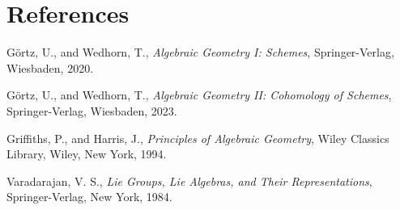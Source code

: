 \documentclass[12pt]{article}
\begin{document}
\section{References}
\begin{enumerate}
    Görtz, U., and Wedhorn, T.,
    \textit{Algebraic Geometry I: Schemes},
    Springer-Verlag, Wiesbaden, 2020.

    Görtz, U., and Wedhorn, T.,
    \textit{Algebraic Geometry II: Cohomology of Schemes},
    Springer-Verlag, Wiesbaden, 2023.

    Griffiths, P., and Harris, J.,
    \textit{Principles of Algebraic Geometry},
    Wiley Classics Library, Wiley, New York, 1994.

    Varadarajan, V. S.,
    \textit{Lie Groups, Lie Algebras, and Their Representations},
    Springer-Verlag, New York, 1984.
\end{enumerate}
\end{document}
